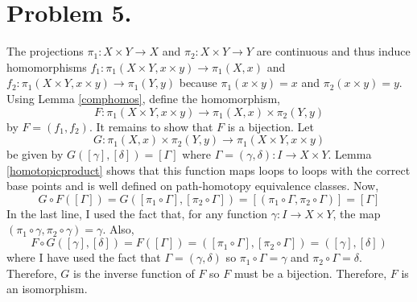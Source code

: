 \documentclass[12pt]{extarticle}
\begin{document}
\section*{Problem 5.}

The projections $\pi_1 : X \times Y \to X$ and $\pi_2 : X \times Y \to Y$ are continuous and thus induce homomorphisms $f_1 : \pi_1(X \times Y, x \times y) \to \pi_1(X, x)$ and $f_2 : \pi_1(X \times Y, x \times y) \to \pi_1(Y, y)$ because $\pi_1(x \times y) = x$ and $\pi_2(x \times y) = y$. Using Lemma \ref{comphomos}, define the homomorphism, \[F : \pi_1(X \times Y, x \times y) \to \pi_1(X, x) \times \pi_2(Y, y)\]
by $F = (f_1, f_2)$. It remains to show that $F$ is a bijection. Let \[G : \pi_1(X, x) \times \pi_2(Y, y) \to \pi_1(X \times Y, x \times y)\] be given by $G([\gamma], [\delta]) = [\Gamma]$ where $\Gamma = (\gamma, \delta) : I \to X \times Y$. Lemma \ref{homotopicproduct} shows that this function maps loops to loops with the correct base points and is well defined on path-homotopy equivalence classes. Now, 
\[G \circ F([\Gamma]) = G([\pi_1 \circ \Gamma], [\pi_2 \circ \Gamma]) = [(\pi_1 \circ \Gamma, \pi_2 \circ \Gamma)] = [\Gamma]\]
In the last line, I used the fact that, for any function $\gamma : I \to X \times Y$, the map $(\pi_1 \circ \gamma, \pi_2 \circ \gamma) = \gamma$.
Also,
\[F \circ G([\gamma], [\delta]) = F([\Gamma]) = ([\pi_1 \circ \Gamma], [\pi_2 \circ \Gamma]) = ([\gamma], [\delta])\]
where I have used the fact that $\Gamma = (\gamma, \delta)$ so $\pi_1 \circ \Gamma = \gamma$ and $\pi_2 \circ \Gamma = \delta$. Therefore, $G$ is the inverse function of $F$ so $F$ must be a bijection. Therefore, $F$ is an isomorphism. 
    
\end{document}
